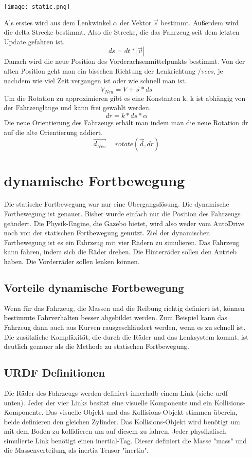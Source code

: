 \begin{center}
    \texttt{[image: static.png]}
\end{center}


Als erstes wird aus dem Lenkwinkel $\alpha$ der Vektor $\vec{s}$ bestimmt.
Außerdem wird die delta Strecke bestimmt. Also die Strecke, die das Fahrzeug seit dem letzten Update gefahren ist.
\[
    ds = dt * |\vec{v}|
\]
Danach wird die neue Position des Vorderachsenmittelpunkts bestimmt. 
Von der alten Position geht man ein bisschen Richtung der Lenkrichtung $/vec{s}$, je nachdem wie viel Zeit vergangen ist oder wie schnell man ist.
\[
    V_{Neu} = V + \vec{s} * ds 
\]
Um die Rotation zu approximieren gibt es eine Konstanten k. k ist abhängig von der Fahrzeuglänge und kann frei gewählt werden.
\[
    dr = k*ds*\alpha
\]
Die neue Orientierung des Fahrzeugs erhält man indem man die neue Rotation dr auf die alte Orientierung addiert.
\[
    \vec{d_{Neu}} = rotate(\vec{d}, dr)
\]

\section{dynamische Fortbewegung}
Die statische Fortbewegung war nur eine Übergangslösung.
Die dynamische Fortbewegung ist genauer. Bisher wurde einfach nur die Position des Fahrzeugs geändert.
Die Physik-Engine, die Gazebo bietet, wird also weder vom AutoDrive noch von der statischen Fortbewegung genutzt.
Ziel der dynamischen Fortbewegung ist es ein Fahrzeug mit vier Rädern zu simulieren.
Das Fahrzeug kann fahren, indem sich die Räder drehen.
Die Hinterräder sollen den Antrieb haben.
Die Vorderräder sollen lenken können.

\subsection*{Vorteile dynamische Fortbewegung}
Wenn für das Fahrzeug, die Massen und die Reibung richtig definiert ist, können bestimmte Fahrverhalten besser abgebildet werden.
Zum Beispiel kann das Fahrzeug dann auch aus Kurven rausgeschläudert werden, wenn es zu schnell ist.
Die zusätzliche Kompläxität, die durch die Räder und das Lenksystem kommt, ist deutlich genauer als die Methode zu statischen Fortbewegung.

\subsection*{URDF Definitionen}
Die Räder des Fahrzeugs werden definiert innerhalb einem Link (siehe urdf unten).
Jeder der vier Links besitzt eine visuelle Komponente und ein Kollisions-Komponente.
Das visuelle Objekt und das Kollisions-Objekt stimmen überein, beide definieren den gleichen Zylinder.
Das Kollisions-Objekt wird benötigt um mit dem Boden zu kollidieren um auf diesem zu fahren.
Jeder physikalisch simulierte Link benötigt einen inertial-Tag.
Dieser definiert die Masse "mass" und die Massenverteilung als inertia Tensor "inertia".

